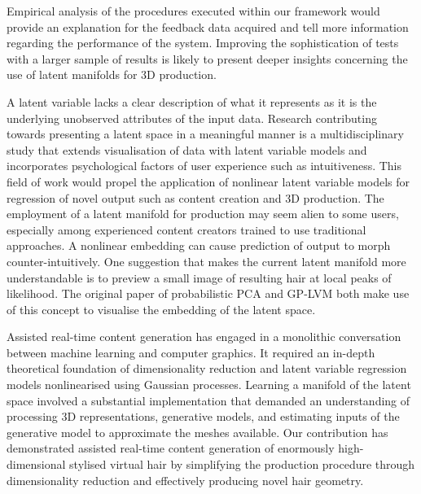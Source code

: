 \documentclass[ %
author={Dillon Keith Diep},
supervisor={Dr. Carl Henrik Ek},
degree={MEng},
title={ART-CG Hair:},
subtitle={Assisted Real-time Content Generation of Stylised Virtual Hair},
type={Research},
year={2017} ]{dissertation}
\begin{document}
Empirical analysis of the procedures executed within our framework would provide an explanation for the feedback data acquired and tell more information regarding the performance of the system. Improving the sophistication of tests with a larger sample of results is likely to present deeper insights concerning the use of latent manifolds for 3D production.

A latent variable lacks a clear description of what it represents as it is the underlying unobserved attributes of the input data. Research contributing towards presenting a latent space in a meaningful manner is a multidisciplinary study that extends visualisation of data with latent variable models and incorporates psychological factors of user experience such as intuitiveness. This field of work would propel the application of nonlinear latent variable models for regression of novel output such as content creation and 3D production.
The employment of a latent manifold for production may seem alien to some users, especially among experienced content creators trained to use traditional approaches. A nonlinear embedding can cause prediction of output to morph counter-intuitively. One suggestion that makes the current latent manifold more understandable is to preview a small image of resulting hair at local peaks of likelihood. The original paper of probabilistic PCA and GP-LVM both make use of this concept to visualise the embedding of the latent space.

Assisted real-time content generation has engaged in a monolithic conversation between machine learning and computer graphics. It required an in-depth theoretical foundation of dimensionality reduction and latent variable regression models nonlinearised using Gaussian processes. 
Learning a manifold of the latent space involved a substantial implementation that demanded an understanding of processing 3D representations, generative models, and estimating inputs of the generative model to approximate the meshes available.
Our contribution has demonstrated assisted real-time content generation of enormously high-dimensional stylised virtual hair by simplifying the production procedure through dimensionality reduction and effectively producing novel hair geometry.



%
%
\end{document}
